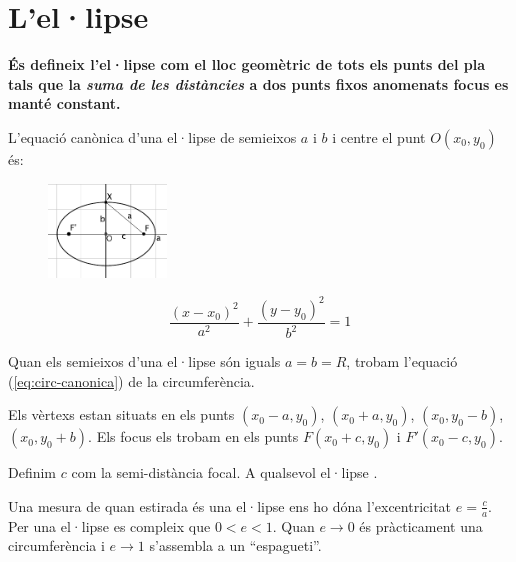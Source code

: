 \section{L'el·lipse}
\begin{theorybox}
	\textbf{És defineix l'el·lipse com el lloc geomètric de tots els punts del pla
    tals que la \textit{suma de les distàncies} a dos punts fixos anomenats focus es manté constant.}
	
	L'equació canònica d'una el·lipse de semieixos $a$ i $b$ i centre el punt $O(x_0, y_0)$ és:
	\begin{figure} 
		\vspace{-1cm}
		\begin{center}
			\includegraphics[width=0.28\textwidth]{img-10/ellip2}
		\end{center}
		\vspace{-1cm}
	\end{figure}
	\begin{equation}
	\label{eq:ellipse-canonica}
	\frac{(x-x_0)^2}{a^2}+\frac{(y-y_0)^2}{b^2}=1
	\end{equation}
	
	
	Quan els semieixos d'una el·lipse són iguals $a=b=R$, trobam l'equació (\ref{eq:circ-canonica}) de la circumferència.
	
	Els vèrtexs estan situats en els punts $(x_0-a, y_0)$, $(x_0+a, y_0)$, $(x_0, y_0-b)$, $(x_0, y_0+b)$. Els focus els trobam en els punts $F(x_0+c, y_0)$ i $F'(x_0-c,y_0)$.
	
	Definim $c$ com la semi-distància focal. A qualsevol el·lipse . 
	
	Una mesura de quan estirada és una el·lipse ens ho dóna l'excentricitat $e=\frac{c}{a}$. Per una el·lipse es compleix que $0<e<1$. Quan $e \rightarrow 0$ és pràcticament una circumferència i $e \rightarrow 1$ s'assembla a un ``espagueti''. 
	
\end{theorybox}


